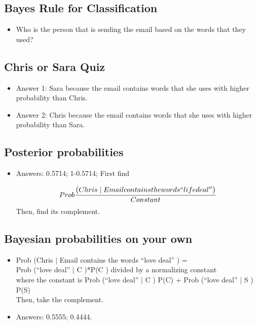 \documentclass[12pt]{report}
\begin{document}
\subsection{Bayes Rule for Classification}

\begin{itemize}

\item Who is the person that is sending the email based on the words that they used? 

\end{itemize}

\subsection{Chris or Sara Quiz}

\begin{itemize}

\item Answer 1: Sara because the email contains words that she uses with higher probability than Chris. 

\item Answer 2: Chris because the email contains words that she uses with higher probability than Sara. 

\end{itemize}

\subsection{Posterior probabilities}

\begin{itemize}

\item Answers: 0.5714; 1-0.5714; First find 

\begin{equation}
Prob \frac{\big(Chris \mid Email contains the words ``life deal'' \big)}{Constant}
\end{equation}
Then, find its complement. 

\end{itemize}

\subsection{Bayesian probabilities on your own}

\begin{itemize}
\item Prob \big(Chris $\mid$ Email contains the words ``love deal'' \big) = \\

Prob \big(``love deal'' $\mid$ C \big)*P\big(C \big) divided by a normalizing constant \\ 

where the constant is Prob \big(``love deal'' $\mid$ C \big) P\big(C) + Prob \big(``love deal'' $\mid$ S \big) P\big(S) \\

Then, take the complement.

\item Answers: 0.5555; 0.4444. 

\end{itemize}
\end{document}
